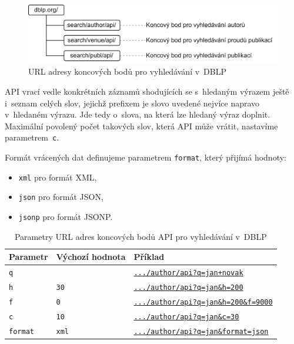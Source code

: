 \documentclass[
  biblatex,
  sourcecodes,
  glossaries,
  index
]{kidiplom}
\begin{document}
\begin{figure}[H]
\begin{center}
\includegraphics[width=12.5cm]{vyhledavani_dblp_api_urls}
\caption{URL adresy koncových bodů pro vyhledávání v~DBLP}\label{fig:struktura_url_adres_vyhledavani_dblp_api}
\end{center}
\end{figure}

API vrací vedle konkrétních záznamů shodujících se s~hledaným výrazem ještě i~seznam celých slov, jejichž prefixem je slovo uvedené nejvíce napravo v~hledaném výrazu. Jde tedy o~slova, na která lze hledaný výraz doplnit. Maximální povolený počet takových slov, která API může vrátit, nastavíme parametrem~\texttt{c}.

Formát vrácených dat definujeme parametrem \texttt{format}, který přijímá hodnoty:
\begin{itemize}
\item \texttt{xml} pro formát XML,
\item \texttt{json} pro formát JSON,
\item \texttt{jsonp} pro formát JSONP.
\end{itemize}

\begin{table}[h]
\begin{center}
\caption{Parametry URL adres koncových bodů API pro vyhledávání v~DBLP}\label{tab:parametry_vyhledavani_api_dblp}
\begin{tabular}{|L{2cm}|L{2cm}|L{9cm}|}
\hline
\textbf{Parametr} & \textbf{Výchozí hodnota} & \textbf{Příklad} \\
\hline
\texttt{q} &  & \href{https://dblp.org/search/author/api?q=jan+novak}{\texttt{.../author/api?q=jan+novak}} \\
\hline
\texttt{h} & \texttt{30} & \href{https://dblp.org/search/author/api?q=jan&h=200}{\texttt{.../author/api?q=jan\&h=200}} \\
\hline
\texttt{f} & \texttt{0} & \href{https://dblp.org/search/author/api?q=jan&h=200&f=9000}{\texttt{.../author/api?q=jan\&h=200\&f=9000}} \\
\hline
\texttt{c} & \texttt{10} & \href{https://dblp.org/search/author/api?q=jan&c=30}{\texttt{.../author/api?q=jan\&c=30}} \\
\hline
\texttt{format} & \texttt{xml} & \href{https://dblp.org/search/author/api?q=jan&format=json}{\texttt{.../author/api?q=jan\&format=json}} \\
\hline
\end{tabular}
\end{center}
\end{table}
\end{document}
